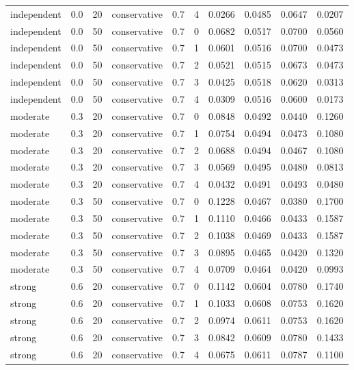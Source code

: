 \begin{table}[!htbp]
{\begin{tabular*}{\linewidth}{@{\extracolsep{\fill}}llrlrrrrrr}
independent & 0.0 & 20 & conservative & 0.7 & 4 & 0.0266 & 0.0485 & 0.0647 & 0.0207 \\
independent & 0.0 & 50 & conservative & 0.7 & 0 & 0.0682 & 0.0517 & 0.0700 & 0.0560 \\
independent & 0.0 & 50 & conservative & 0.7 & 1 & 0.0601 & 0.0516 & 0.0700 & 0.0473 \\
independent & 0.0 & 50 & conservative & 0.7 & 2 & 0.0521 & 0.0515 & 0.0673 & 0.0473 \\
independent & 0.0 & 50 & conservative & 0.7 & 3 & 0.0425 & 0.0518 & 0.0620 & 0.0313 \\
independent & 0.0 & 50 & conservative & 0.7 & 4 & 0.0309 & 0.0516 & 0.0600 & 0.0173 \\
moderate & 0.3 & 20 & conservative & 0.7 & 0 & 0.0848 & 0.0492 & 0.0440 & 0.1260 \\
moderate & 0.3 & 20 & conservative & 0.7 & 1 & 0.0754 & 0.0494 & 0.0473 & 0.1080 \\
moderate & 0.3 & 20 & conservative & 0.7 & 2 & 0.0688 & 0.0494 & 0.0467 & 0.1080 \\
moderate & 0.3 & 20 & conservative & 0.7 & 3 & 0.0569 & 0.0495 & 0.0480 & 0.0813 \\
moderate & 0.3 & 20 & conservative & 0.7 & 4 & 0.0432 & 0.0491 & 0.0493 & 0.0480 \\
moderate & 0.3 & 50 & conservative & 0.7 & 0 & 0.1228 & 0.0467 & 0.0380 & 0.1700 \\
moderate & 0.3 & 50 & conservative & 0.7 & 1 & 0.1110 & 0.0466 & 0.0433 & 0.1587 \\
moderate & 0.3 & 50 & conservative & 0.7 & 2 & 0.1038 & 0.0469 & 0.0433 & 0.1587 \\
moderate & 0.3 & 50 & conservative & 0.7 & 3 & 0.0895 & 0.0465 & 0.0420 & 0.1320 \\
moderate & 0.3 & 50 & conservative & 0.7 & 4 & 0.0709 & 0.0464 & 0.0420 & 0.0993 \\
strong & 0.6 & 20 & conservative & 0.7 & 0 & 0.1142 & 0.0604 & 0.0780 & 0.1740 \\
strong & 0.6 & 20 & conservative & 0.7 & 1 & 0.1033 & 0.0608 & 0.0753 & 0.1620 \\
strong & 0.6 & 20 & conservative & 0.7 & 2 & 0.0974 & 0.0611 & 0.0753 & 0.1620 \\
strong & 0.6 & 20 & conservative & 0.7 & 3 & 0.0842 & 0.0609 & 0.0780 & 0.1433 \\
strong & 0.6 & 20 & conservative & 0.7 & 4 & 0.0675 & 0.0611 & 0.0787 & 0.1100 \\

\end{tabular*}}
\end{table}
